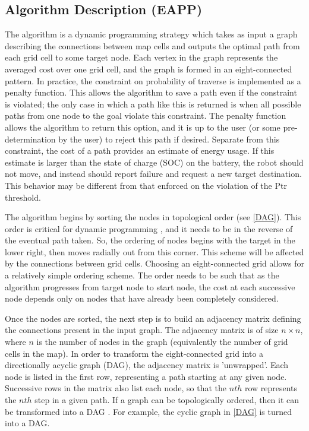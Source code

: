\documentclass[journal]{IEEEtran}
\begin{document}
\subsection{Algorithm Description (EAPP)}
The algorithm is a dynamic programming strategy which takes as input a graph describing the connections between map cells and outputs the optimal path from each grid cell to some target node. 
Each vertex in the graph represents the averaged cost over one grid cell, and the graph is formed in an eight-connected pattern. 
In practice, the constraint on probability of traverse is implemented as a penalty function. 
This allows the algorithm to save a path even if the constraint is violated; the only case in which a path like this is returned is when all possible paths from one node to the goal violate this constraint. 
The penalty function allows the algorithm to return this option, and it is up to the user (or some pre-determination by the user) to reject this path if desired. 
Separate from this constraint, the cost of a path provides an estimate of energy usage. 
If this estimate is larger than the state of charge (SOC) on the battery, the robot should not move, and instead should report failure and request a new target destination. 
This behavior may be different from that enforced on the violation of the Ptr threshold.

The algorithm begins by sorting the nodes in topological order (see \ref{DAG}). 
This order is critical for dynamic programming \cite{(Dynamic Programming book)}, and it needs to be in the reverse of the eventual path taken. 
So, the ordering of nodes begins with the target in the lower right, then moves radially out from this corner. 
This scheme will be affected by the connections between grid cells. 
Choosing an eight-connected grid allows for a relatively simple ordering scheme. 
The order needs to be such that as the algorithm progresses from target node to start node, the cost at each successive node depends only on nodes that have already been completely considered. 

Once the nodes are sorted, the next step is to build an adjacency matrix defining the connections present in the input graph.
The adjacency matrix is of size $n \times n$, where $n$ is the number of nodes in the graph (equivalently the number of grid cells in the map). 
In order to transform the eight-connected grid into a directionally acyclic graph (DAG), the adjacency matrix is 'unwrapped'. 
Each node is listed in the first row, representing a path starting at any given node. 
Successive rows in the matrix also list each node, so that the $nth$ row represents the $nth$ step in a given path. 
If a graph can be topologically ordered, then it can be transformed into a DAG \cite{vazirani algorithms ch. 6}. For example, the cyclic graph in \ref{DAG} is turned into a DAG.
\end{document}
